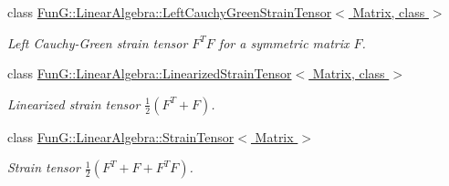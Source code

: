 \begin{DoxyCompactItemize}
class \hyperlink{classFunG_1_1LinearAlgebra_1_1LeftCauchyGreenStrainTensor}{Fun\-G\-::\-Linear\-Algebra\-::\-Left\-Cauchy\-Green\-Strain\-Tensor$<$ Matrix, class $>$}
\begin{DoxyCompactList}\small\item\em Left Cauchy-\/\-Green strain tensor $ F^T F $ for a symmetric matrix $ F $. \end{DoxyCompactList}\item 
class \hyperlink{classFunG_1_1LinearAlgebra_1_1LinearizedStrainTensor}{Fun\-G\-::\-Linear\-Algebra\-::\-Linearized\-Strain\-Tensor$<$ Matrix, class $>$}
\begin{DoxyCompactList}\small\item\em Linearized strain tensor $ \frac{1}{2}\left(F^T+F\right) $. \end{DoxyCompactList}\item 
class \hyperlink{classFunG_1_1LinearAlgebra_1_1StrainTensor}{Fun\-G\-::\-Linear\-Algebra\-::\-Strain\-Tensor$<$ Matrix $>$}
\begin{DoxyCompactList}\small\item\em Strain tensor $ \frac{1}{2}\left(F^T+F + F^T F\right) $. \end{DoxyCompactList}\end{DoxyCompactItemize}
